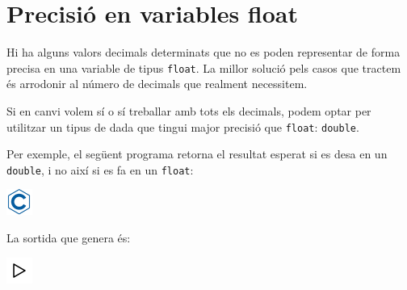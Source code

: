 \documentclass[]{book}
\newenvironment{Shaded}{\begin{snugshade}}{\end{snugshade}}
\newcommand{\DataTypeTok}[1]{\textcolor[rgb]{0.13,0.29,0.53}{#1}}
\newcommand{\DecValTok}[1]{\textcolor[rgb]{0.00,0.00,0.81}{#1}}
\newcommand{\FloatTok}[1]{\textcolor[rgb]{0.00,0.00,0.81}{#1}}
\newcommand{\SpecialCharTok}[1]{\textcolor[rgb]{0.00,0.00,0.00}{#1}}
\newcommand{\StringTok}[1]{\textcolor[rgb]{0.31,0.60,0.02}{#1}}
\newcommand{\ImportTok}[1]{#1}
\newcommand{\ControlFlowTok}[1]{\textcolor[rgb]{0.13,0.29,0.53}{\textbf{#1}}}
\newcommand{\PreprocessorTok}[1]{\textcolor[rgb]{0.56,0.35,0.01}{\textit{#1}}}
\newcommand{\NormalTok}[1]{#1}
\begin{document}
\section{Precisió en variables float}\label{precisio-en-variables-float}

Hi ha alguns valors decimals determinats que no es poden representar de
forma precisa en una variable de tipus \texttt{float}. La millor solució
pels casos que tractem és arrodonir al número de decimals que realment
necessitem.

Si en canvi volem sí o sí treballar amb tots els decimals, podem optar
per utilitzar un tipus de dada que tingui major precisió que
\texttt{float}: \texttt{double}.

Per exemple, el següent programa retorna el resultat esperat si es desa
en un \texttt{double}, i no així si es fa en un \texttt{float}:

\includegraphics{./img/c.png}

\begin{Shaded}
\end{Shaded}

La sortida que genera és:

\includegraphics{./img/play.png}
\end{document}
